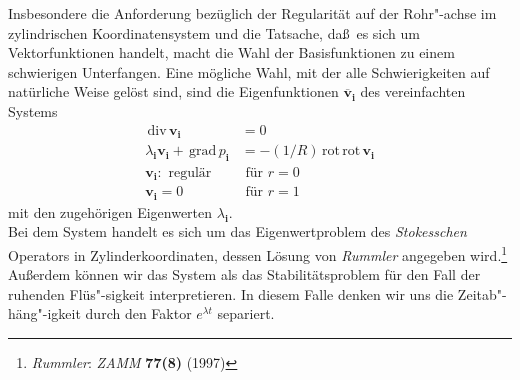 \documentclass[10pt,a5paper,oneside,draft]{book}
\numberwithin{equation}{chapter}
\begin{document}
Insbesondere die Anforderung bez\"uglich der Regularit\"at auf der Rohr"-achse im zylindrischen Koordinatensystem und die Tatsache, da\ss\ es sich um Vektorfunktionen handelt, macht die Wahl der Basisfunktionen zu einem schwierigen Unterfangen.
Eine m\"ogliche Wahl, mit der alle Schwierigkeiten auf nat\"urliche Weise gel\"ost sind, sind die Eigenfunktionen $\mathbf{\overline{v}}_\mathbf{i}$ des vereinfachten Systems
\begin{equation}\label{eq:stokessystem}
	\begin{split}
	\,\mathrm{div}\,\mathbf{v}_\mathbf{i} &= 0\\
	\lambda_\mathbf{i} \mathbf{v}_\mathbf{i} + \,\mathrm{grad}\,p_\mathbf{i} &= - (1/R) \,\mathrm{rot}\,\mathrm{rot}\,\mathbf{v}_\mathbf{i}\\
	\mathbf{v}_\mathbf{i}:\textrm{ regul\"ar }&\textrm{ f\"ur } r=0\\
	\mathbf{v}_\mathbf{i} = 0\quad&\textrm{ f\"ur } r=1
	\end{split}
\end{equation}
mit den zugeh\"origen Eigenwerten $\lambda_\mathbf{i}$.\\
Bei dem System handelt es sich um das Eigenwertproblem des \textsl{Stokesschen} Operators in Zylinderkoordinaten, dessen L\"osung von \textsl{Rummler} angegeben wird.\footnote{\label{bib:rummler}\textsl{Rummler}: \textit{ZAMM} \textbf{77(8)} (1997)}
Au\ss erdem k\"onnen wir das System als das Stabilit\"atsproblem f\"ur den Fall der ruhenden Fl\"us"-sigkeit interpretieren.
In diesem Falle denken wir uns die Zeitab"-h\"ang"-igkeit durch den Faktor $e^{\lambda t}$ separiert.\\
\end{document}
